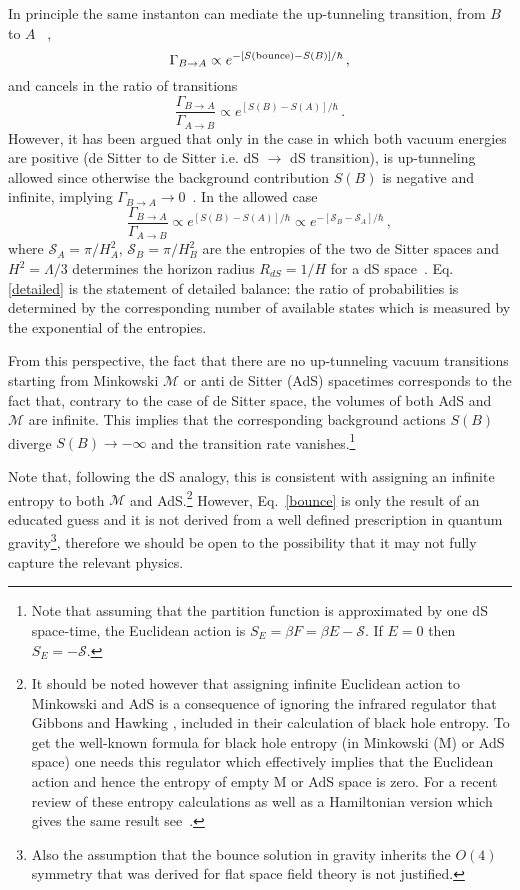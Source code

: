 \documentclass[a4paper,11pt]{article}
\numberwithin{equation}{section}
\newcommand{\be}{\begin{equation}}
\newcommand{\ee}{\end{equation}}
\def\S{\mathcal S}
\def\M{\mathcal M}
\numberwithin{equation}{section}
\begin{document}
In principle the same instanton can mediate the up-tunneling transition, from $B$ to $A$ ~\cite{Lee:1987qc},
\be
\Gamma_{B\rightarrow A} \propto e^{-\left[S({\rm bounce})- S(B)\right]/\hbar} \,, \label{bounce2}
\ee
and cancels in  the ratio of transitions
 \be
 \frac{\Gamma_{B\rightarrow A} }{\Gamma_{A\rightarrow B} } \propto e^{\left[S({B})- S(A)\right]/\hbar} \,.
 \ee
 However, it has been argued that only in the case in which both vacuum energies are positive (de Sitter to de Sitter i.e. dS $\rightarrow$ dS transition), is up-tunneling  allowed since otherwise the background contribution $S(B)$ is negative and infinite, implying $\Gamma_{B\rightarrow A} \rightarrow 0$~\cite{Lee:1987qc}. In the allowed case 
  \be
 \frac{\Gamma_{B\rightarrow A} }{\Gamma_{A\rightarrow B} } \propto e^{\left[S({B})- S(A)\right]/\hbar} \propto e^{-\left[\S_B- \S_A\right]/\hbar} \,, \label{detailed}
 \ee
 where $\S_A=\pi/H_A^2, \, \S_B=\pi/H_B^2$ are the entropies of the two de Sitter spaces and $H^2=\Lambda/3$ determines the horizon radius $R_{dS}=1/H$ for a dS space~\cite{Gibbons:1976ue}. Eq. \eqref{detailed} is the statement of detailed balance: the ratio of probabilities is determined by the corresponding  number of available states which is measured by the exponential of the entropies. 
 \vskip 1mm
 
From this perspective, the fact that there are no up-tunneling vacuum transitions starting from Minkowski $\M$ or anti de Sitter (AdS) spacetimes corresponds to the fact that, contrary to the case of de Sitter space,  the volumes of both AdS and $\M$ are infinite. This implies that the corresponding background actions $S(B)$ diverge $S(B)\rightarrow -\infty$ and the transition rate vanishes.\footnote{Note that assuming that the partition function is approximated by one dS space-time, the Euclidean action is $S_E=\beta F=\beta E-{\S}$. If $E=0$ then $S_E=-\S$.} 
\vskip 1mm

Note that, following the dS analogy, this is consistent with assigning an infinite entropy to both $\M$ and AdS.\footnote{It should be noted however that assigning infinite Euclidean action to Minkowski and AdS is a consequence of ignoring the infrared regulator that Gibbons and Hawking \cite{Gibbons:1976ue},\cite{Gibbons:1977mu}  included in their calculation of black hole entropy. To get the well-known formula for black hole entropy (in Minkowski (M) or AdS space) one needs this regulator  which effectively implies that the Euclidean action and hence the entropy of empty  M or AdS space is zero. For a recent review of these entropy calculations as well as a Hamiltonian version which gives the same result see~\cite{deAlwis:2023tab}.} However, Eq.~\eqref{bounce} is only the result of an educated guess and it is not derived from a well defined prescription in quantum  gravity\footnote{Also the assumption that the bounce solution in gravity inherits the $O(4)$ symmetry that was derived  for flat space field theory is not justified.}, therefore we should be open to the possibility that it may not fully capture the relevant physics. 
\vskip 1mm
\end{document}
